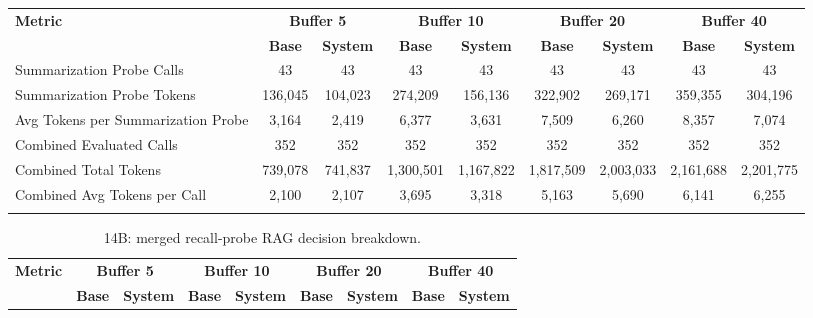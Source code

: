 \documentclass[pdflatex,sn-mathphys-num]{sn-jnl}%
\theoremstyle{thmstyleone}%
\theoremstyle{thmstyletwo}%
\theoremstyle{thmstylethree}%
\begin{document}
\begin{appendices}
\begin{landscape}
\begin{longtable}{@{}p{3.8cm}cccccccc@{}}
\toprule
\textbf{Metric} & \multicolumn{2}{c}{\textbf{Buffer 5}} & \multicolumn{2}{c}{\textbf{Buffer 10}} & \multicolumn{2}{c}{\textbf{Buffer 20}} & \multicolumn{2}{c}{\textbf{Buffer 40}} \\
\cmidrule(lr){2-3}\cmidrule(lr){4-5}\cmidrule(lr){6-7}\cmidrule(lr){8-9}
 & \textbf{Base} & \textbf{System} & \textbf{Base} & \textbf{System} & \textbf{Base} & \textbf{System} & \textbf{Base} & \textbf{System} \\
\midrule
\endhead
Summarization Probe Calls & 43 & 43 & 43 & 43 & 43 & 43 & 43 & 43 \\
Summarization Probe Tokens & 136,045 & 104,023 & 274,209 & 156,136 & 322,902 & 269,171 & 359,355 & 304,196 \\
Avg Tokens per Summarization Probe & 3,164 & 2,419 & 6,377 & 3,631 & 7,509 & 6,260 & 8,357 & 7,074 \\
Combined Evaluated Calls & 352 & 352 & 352 & 352 & 352 & 352 & 352 & 352 \\
Combined Total Tokens & 739,078 & 741,837 & 1,300,501 & 1,167,822 & 1,817,509 & 2,003,033 & 2,161,688 & 2,201,775 \\
Combined Avg Tokens per Call & 2,100 & 2,107 & 3,695 & 3,318 & 5,163 & 5,690 & 6,141 & 6,255 \\
\botrule
\end{longtable}
\normalsize
\end{landscape}
\begin{landscape}
\tiny
\begin{longtable}{@{}p{3.8cm}cccccccc@{}}
\caption{14B: merged recall-probe RAG decision breakdown.}\label{tab:app_14b_rag_probe}\\

\toprule
\textbf{Metric} & \multicolumn{2}{c}{\textbf{Buffer 5}} & \multicolumn{2}{c}{\textbf{Buffer 10}} & \multicolumn{2}{c}{\textbf{Buffer 20}} & \multicolumn{2}{c}{\textbf{Buffer 40}} \\
\cmidrule(lr){2-3}\cmidrule(lr){4-5}\cmidrule(lr){6-7}\cmidrule(lr){8-9}
 & \textbf{Base} & \textbf{System} & \textbf{Base} & \textbf{System} & \textbf{Base} & \textbf{System} & \textbf{Base} & \textbf{System} \\
\midrule
\endfirsthead


\end{longtable}
\end{landscape}
\end{appendices}
\end{document}
